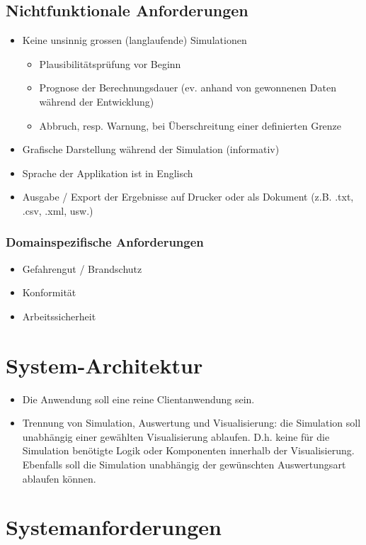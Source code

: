 \documentclass[11pt,a4paper]{article}
\begin{document}
\subsection{Nichtfunktionale Anforderungen}
\begin{itemize}
  \item Keine unsinnig grossen (langlaufende) Simulationen
    \begin{itemize}
    \item Plausibilitätsprüfung vor Beginn
    \item Prognose der Berechnungsdauer (ev. anhand von gewonnenen Daten während der Entwicklung)
    \item Abbruch, resp. Warnung, bei Überschreitung einer definierten Grenze 
  \end{itemize}
  \item Grafische Darstellung während der Simulation (informativ)
  \item Sprache der Applikation ist in Englisch
  \item Ausgabe / Export der Ergebnisse auf Drucker oder als Dokument (z.B. .txt, .csv, .xml, usw.)
\end{itemize}

%
\subsubsection{Domainspezifische Anforderungen}
\begin{itemize}
  \item Gefahrengut / Brandschutz
  \item Konformität
  \item Arbeitssicherheit
\end{itemize}
%
\section{System-Architektur}
\begin{itemize}
  \item Die Anwendung soll eine reine Clientanwendung sein.
  \item Trennung von Simulation, Auswertung und Visualisierung: die Simulation soll unabhängig einer gewählten Visualisierung ablaufen. D.h. keine für die Simulation benötigte Logik oder Komponenten innerhalb der Visualisierung. Ebenfalls soll die Simulation unabhängig der gewünschten Auswertungsart ablaufen können.
\end{itemize}
%
\section{Systemanforderungen}
%
\end{document}
